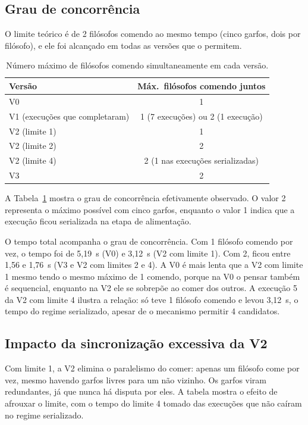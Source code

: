 \documentclass[12pt,brazil,a4paper]{article}
\begin{document}
\subsection{Grau de concorrência}
O limite teórico é de 2 filósofos comendo ao mesmo tempo (cinco garfos, dois por filósofo), e ele foi alcançado em todas as versões que o permitem.

\begin{table}[H]
\centering
\small
\begin{tabular}{lc}
\toprule
Versão & Máx.\ filósofos comendo juntos\\
\midrule
V0 & 1\\
V1 (execuções que completaram) & 1 (7 execuções) ou 2 (1 execução)\\
V2 (limite 1) & 1\\
V2 (limite 2) & 2\\
V2 (limite 4) & 2 (1 nas execuções serializadas)\\
V3 & 2\\
\bottomrule
\end{tabular}
\caption{Número máximo de filósofos comendo simultaneamente em cada versão.}
\label{tab:grau-concorrencia}
\end{table}

A Tabela~\ref{tab:grau-concorrencia} mostra o grau de concorrência efetivamente observado. O valor 2 representa o máximo possível com cinco garfos, enquanto o valor 1 indica que a execução ficou serializada na etapa de alimentação.

O tempo total acompanha o grau de concorrência. Com 1 filósofo comendo por vez, o tempo foi de 5,19~s (V0) e 3,12~s (V2 com limite 1). Com 2, ficou entre 1,56 e 1,76~s (V3 e V2 com limites 2 e 4). A V0 é mais lenta que a V2 com limite 1 mesmo tendo o mesmo máximo de 1 comendo, porque na V0 o pensar também é sequencial, enquanto na V2 ele se sobrepõe ao comer dos outros. A execução 5 da V2 com limite 4 ilustra a relação: só teve 1 filósofo comendo e levou 3,12~s, o tempo do regime serializado, apesar de o mecanismo permitir 4 candidatos.

\subsection{Impacto da sincronização excessiva da V2}
Com limite 1, a V2 elimina o paralelismo do comer: apenas um filósofo come por vez, mesmo havendo garfos livres para um não vizinho. Os garfos viram redundantes, já que nunca há disputa por eles. A tabela mostra o efeito de afrouxar o limite, com o tempo do limite 4 tomado das execuções que não caíram no regime serializado.
\end{document}
